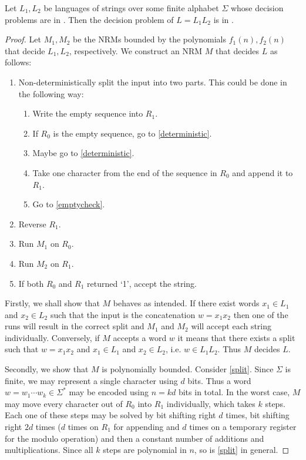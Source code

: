 \documentclass{article}
\begin{document}
\begin{claim*}[c]
	Let $L_1,L_2$ be languages of strings over some finite alphabet $\Sigma$ whose decision problems are in
	\nptime. Then the decision problem of $L=L_1L_2$ is in \nptime.
	\begin{proof}
		Let $M_1,M_2$ be the NRMs bounded by the polynomials $f_1(n),f_2(n)$ that decide $L_1,L_2$, respectively.
		We construct an NRM $M$ that decides $L$ as follows:
		\begin{enumerate}[label=M\arabic*]
			\item \label{split} Non-deterministically split the input into two parts. This could be done in the following way:
			      \begin{enumerate}
				      \item Write the empty sequence into $R_1$.
				      \item \label{emptycheck} If $R_0$ is the empty sequence, go to \ref{deterministic}.
				      \item Maybe go to \ref{deterministic}.
				      \item Take one character from the end of the sequence in $R_0$ and append it to $R_1$.
				      \item Go to \ref{emptycheck}.
			      \end{enumerate}
			\item \label{deterministic} Reverse $R_1$.
			\item \label{runm1} Run $M_1$ on $R_0$.
			\item \label{runm2} Run $M_2$ on $R_1$.
			\item \label{trivial} If both $R_0$ and $R_1$ returned `1', accept the string.
		\end{enumerate}
		Firstly, we shall show that $M$ behaves as intended. If there exist words $x_1\in L_1$ and $x_2\in L_2$ such that the input
		is the concatenation $w=x_1x_2$ then one of the runs will result in the correct
		split and $M_1$ and $M_2$ will accept each string individually.  Conversely,
		if $M$ accepts a word $w$ it means that there exists a split such that
		$w=x_1x_2$ and $x_1\in L_1$ and $x_2\in L_2$, i.e. $w\in L_1L_2$. Thus $M$
		decides $L$.

		Secondly, we show that $M$ is polynomially bounded. Consider \ref{split}. Since $\Sigma$ is finite, we may
		represent a single character using
		$d$ bits. Thus a word $w=w_1\cdots w_k \in\Sigma^*$ may be encoded using $n=kd$ bits in total.
		In the worst case, $M$ may move
		every character out of $R_0$ into $R_1$ individually, which takes $k$ steps. Each one of these steps
		may be solved by bit shifting right $d$ times, bit shifting right $2d$ times ($d$ times on $R_1$ for appending
		and $d$ times on a temporary register for the modulo operation) and then a constant number of additions and multiplications.
		Since all $k$ steps are polynomial in $n$, so is \ref{split} in general.


\end{proof}
\end{claim*}
\end{document}
